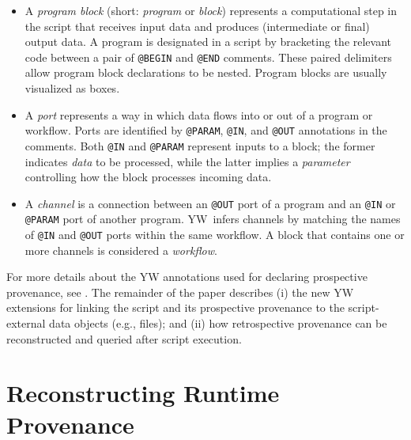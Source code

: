 \documentclass[letterpaper,twocolumn,10pt]{article}
\newcommand{\yw}{\textsf{YW}}
\newcommand{\ywa}[1]{\texttt{#1}}
\begin{document}
\begin{itemize}
\item A \emph{program block} (short: \emph{program} or \emph{block})
  represents a computational step in the script that receives input
  data and produces (intermediate or final) output data. A program is
  designated in a script by bracketing the relevant code between a
  pair of \ywa{@BEGIN} and \ywa{@END} comments. These paired
  delimiters allow program block declarations to be nested. Program blocks are
  usually visualized as boxes. 
\item A \emph{port} represents a way in which data flows into or out
  of a program or workflow. Ports are identified by \ywa{@PARAM},
  \ywa{@IN}, and \ywa{@OUT} annotations in the comments.  Both
  \ywa{@IN} and \ywa{@PARAM} represent inputs to a block; the former
  indicates \emph{data} to be processed, while the latter implies a
  \emph{parameter} controlling how the block processes incoming data.
\item A \emph{channel} is a connection between an \ywa{@OUT} port of a
  program and an \ywa{@IN} or \ywa{@PARAM} port of another 
  program. \yw\ infers channels by matching the names of \ywa{@IN} and
  \ywa{@OUT} ports within the same workflow.  A block that contains
  one or more channels is considered a \emph{workflow}.
\end{itemize}

For more details about the YW annotations used for declaring
prospective provenance, see \cite{mcphillips2015ywIJDC}.  The
remainder of the paper describes (i) the new YW extensions for linking
the script and its prospective provenance to the script-external data
objects (e.g., files); and (ii) how retrospective provenance can be
reconstructed and queried after script execution.

\section{Reconstructing Runtime Provenance}
\label{sec:reconstr-retr-prov}
\end{document}
